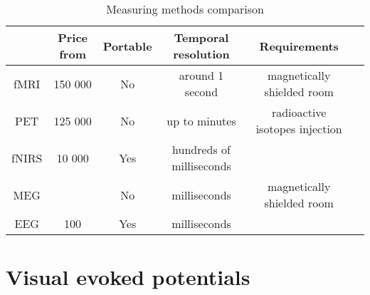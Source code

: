 \begin{table}[h]
	\centering
	\begin{tabular}{|c|c|c|c|c|c|}
		\hline
				& Price	from	& Portable	& Temporal resolution & Requirements\\\hline
		fMRI	& 150 000	& No	  	& around 1 second	  & magnetically shielded room\\\hline
		PET		& 125 000	& No		& up to minutes		  & radioactive isotopes injection\\\hline
		fNIRS	& 10 000 	& Yes		& hundreds of milliseconds & 			\\\hline
		MEG		&			& No		& milliseconds		  & magnetically shielded room\\\hline
		EEG		& 100 		& Yes		& milliseconds 		  & 				\\\hline
	\end{tabular}
	\caption{Measuring methods comparison}
	\label{tab:measuring methods}
\end{table}

\section{Visual evoked potentials}
 